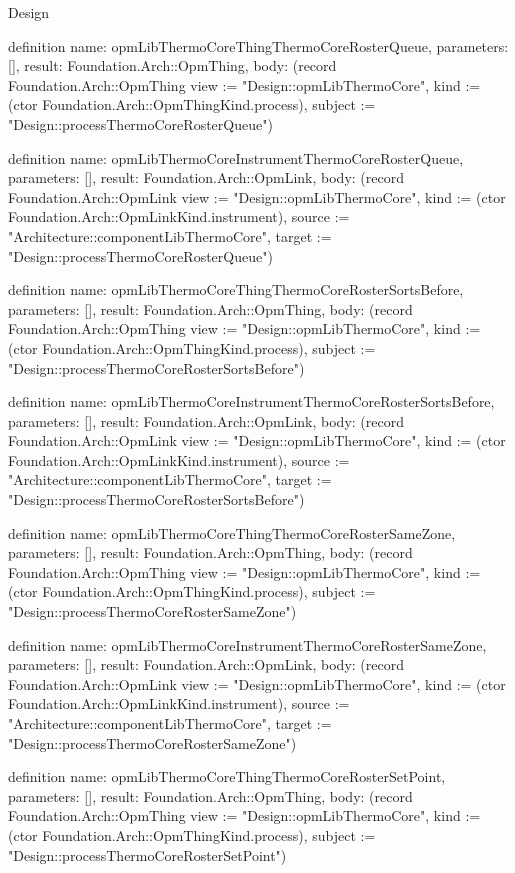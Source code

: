 \begin{lexlean}{Design}
\begin{semanticmodule}
definition{
  name: opmLibThermoCoreThingThermoCoreRosterQueue,
  parameters: [],
  result: Foundation.Arch::OpmThing,
  body: (record Foundation.Arch::OpmThing {view := "Design::opmLibThermoCore", kind := (ctor Foundation.Arch::OpmThingKind.process), subject := "Design::processThermoCoreRosterQueue"})
}

definition{
  name: opmLibThermoCoreInstrumentThermoCoreRosterQueue,
  parameters: [],
  result: Foundation.Arch::OpmLink,
  body: (record Foundation.Arch::OpmLink {view := "Design::opmLibThermoCore", kind := (ctor Foundation.Arch::OpmLinkKind.instrument), source := "Architecture::componentLibThermoCore", target := "Design::processThermoCoreRosterQueue"})
}

definition{
  name: opmLibThermoCoreThingThermoCoreRosterSortsBefore,
  parameters: [],
  result: Foundation.Arch::OpmThing,
  body: (record Foundation.Arch::OpmThing {view := "Design::opmLibThermoCore", kind := (ctor Foundation.Arch::OpmThingKind.process), subject := "Design::processThermoCoreRosterSortsBefore"})
}

definition{
  name: opmLibThermoCoreInstrumentThermoCoreRosterSortsBefore,
  parameters: [],
  result: Foundation.Arch::OpmLink,
  body: (record Foundation.Arch::OpmLink {view := "Design::opmLibThermoCore", kind := (ctor Foundation.Arch::OpmLinkKind.instrument), source := "Architecture::componentLibThermoCore", target := "Design::processThermoCoreRosterSortsBefore"})
}

definition{
  name: opmLibThermoCoreThingThermoCoreRosterSameZone,
  parameters: [],
  result: Foundation.Arch::OpmThing,
  body: (record Foundation.Arch::OpmThing {view := "Design::opmLibThermoCore", kind := (ctor Foundation.Arch::OpmThingKind.process), subject := "Design::processThermoCoreRosterSameZone"})
}

definition{
  name: opmLibThermoCoreInstrumentThermoCoreRosterSameZone,
  parameters: [],
  result: Foundation.Arch::OpmLink,
  body: (record Foundation.Arch::OpmLink {view := "Design::opmLibThermoCore", kind := (ctor Foundation.Arch::OpmLinkKind.instrument), source := "Architecture::componentLibThermoCore", target := "Design::processThermoCoreRosterSameZone"})
}

definition{
  name: opmLibThermoCoreThingThermoCoreRosterSetPoint,
  parameters: [],
  result: Foundation.Arch::OpmThing,
  body: (record Foundation.Arch::OpmThing {view := "Design::opmLibThermoCore", kind := (ctor Foundation.Arch::OpmThingKind.process), subject := "Design::processThermoCoreRosterSetPoint"})
}


\end{semanticmodule}
\end{lexlean}

